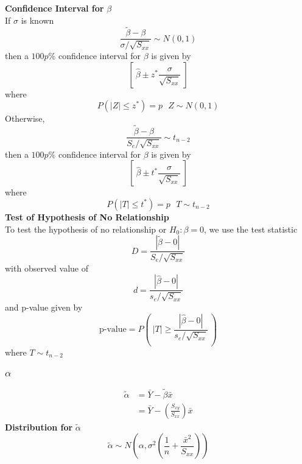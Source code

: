 \documentclass[12pt, leqno]{article}
\theoremstyle{definition}
\begin{document}
  \textbf{Confidence Interval for} $\beta$ \\
  If $\sigma$ is known
  $$\frac{\widetilde{\beta} - \beta}{\sigma / \sqrt{S_{xx}}} \sim N(0, 1)$$
  then a $100p\%$ confidence interval for $\beta$ is given by
  $$\left[~ \hat{\beta} \pm z^{*}\frac{\sigma}{\sqrt{S_{xx}}} ~\right]$$
  where
  $$P(|Z| \leq z^{*}) = p ~~~ Z \sim N(0, 1)$$
  \newline
  Otherwise,
  $$\frac{\widetilde{\beta} - \beta}{S_{e} / \sqrt{S_{xx}}} \sim t_{n-2}$$
  then a $100p\%$ confidence interval for $\beta$ is given by
  $$\left[~ \hat{\beta} \pm t^{*}\frac{\sigma}{\sqrt{S_{xx}}} ~\right]$$
  where
  $$P(|T| \leq t^{*}) = p ~~~ T \sim t_{n-2}$$
  \newline
  \textbf{Test of Hypothesis of No Relationship} \\
  To test the hypothesis of no relationship or $H_{0}: \beta = 0$, we use the test statistic
  $$D = \frac{|\widetilde{\beta} - 0|}{S_{e} / \sqrt{S_{xx}}}$$
  with observed value of
  $$d = \frac{|\hat{\beta} - 0|}{s_{e} / \sqrt{S_{xx}}}$$
  and p-value given by
  $$\text{p-value} = P\left(~|T| \geq \frac{|\hat{\beta} - 0|}{s_{e} / \sqrt{S_{xx}}}~\right)$$
  where $T \sim t_{n-2}$

  \subsubsection{$\alpha$}
  \begin{align*}
  \widetilde{\alpha} &= \bar{Y} - \widetilde{\beta}\bar{x} \\
  &= \bar{Y} - \left(\frac{S_{xy}}{S_{xx}}\right)\bar{x}
  \end{align*}
  \textbf{Distribution for } $\widetilde{\alpha}$ \\
  $$\widetilde{\alpha} \sim N\left(\alpha, \sigma^{2}\left(\frac{1}{n} + \frac{\bar{x}^{2}}{S_{xx}}\right)\right)$$
\end{document}
